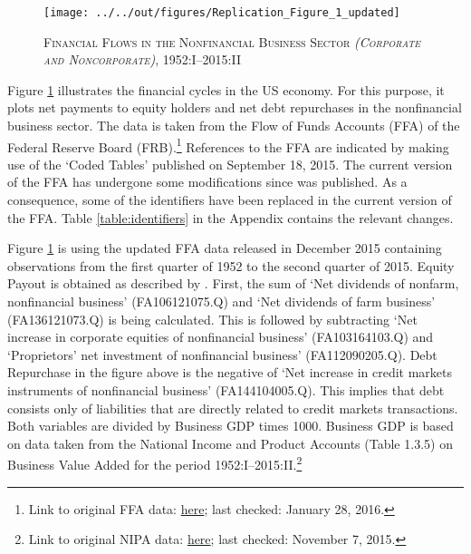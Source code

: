 
\begin{figure}
    
    \centering

    \texttt{[image: ../../out/figures/Replication\_Figure\_1\_updated]}

    \caption{\textsc{Financial Flows in the Nonfinancial Business Sector \textit{(Corporate and Noncorporate)}}, 1952:I--2015:II}
    
    \label{fig:figure_1}

\end{figure}


Figure \ref{fig:figure_1} illustrates the financial cycles in the US economy. For this purpose, it plots net payments to equity holders and net debt repurchases in the nonfinancial business sector. The data is taken from the Flow of Funds Accounts (FFA) of the Federal Reserve Board (FRB).\footnote{Link to original FFA data: \href{http://www.federalreserve.gov/datadownload/Download.aspx?rel=Z1&series=1f08e962a27dff21b89a7212d58b8346&filetype=spreadsheetml&label=include&layout=seriescolumn&from=03/01/1952&to=06/30/2015}{here}; last checked: January 28, 2016.}
References to the FFA are indicated by making use of the ‘Coded Tables’ published on September 18, 2015. The current version of the FFA has undergone some modifications since \citet{JERMANNfinancial} was published. As a consequence, some of the identifiers have been replaced in the current version of the FFA. Table \ref{table:identifiers} in the Appendix contains the relevant changes.

Figure \ref{fig:figure_1} is using the updated FFA data released in December 2015 containing observations from the first quarter of 1952 to the second quarter of 2015. Equity Payout is obtained as described by \citeauthor{JERMANNfinancial}. First, the sum of ‘Net dividends of nonfarm, nonfinancial business’ (FA106121075.Q) and ‘Net dividends of farm business’ (FA136121073.Q) is being calculated. This is followed by subtracting ‘Net increase in corporate equities of nonfinancial business’ (FA103164103.Q) and ‘Proprietors’ net investment of nonfinancial business’ (FA112090205.Q). Debt Repurchase in the figure above is the negative of ‘Net increase in credit markets instruments of nonfinancial business’ (FA144104005.Q). This implies that debt consists only of liabilities that are directly related to credit markets transactions. Both variables are divided by Business GDP times 1000. Business GDP is based on data taken from the National Income and Product Accounts (Table 1.3.5) on Business Value Added for the period 1952:I--2015:II.\footnote{Link to original NIPA data: \href{http://www.bea.gov//national/nipaweb/DownSS2.asp}{here}; last checked: November 7, 2015.} 

